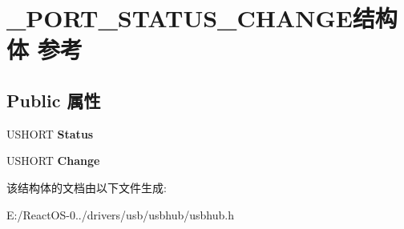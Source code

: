 \hypertarget{struct___p_o_r_t___s_t_a_t_u_s___c_h_a_n_g_e}{}\section{\+\_\+\+P\+O\+R\+T\+\_\+\+S\+T\+A\+T\+U\+S\+\_\+\+C\+H\+A\+N\+G\+E结构体 参考}
\label{struct___p_o_r_t___s_t_a_t_u_s___c_h_a_n_g_e}
\subsection*{Public 属性}
\begin{DoxyCompactItemize}
\item 
\mbox{\label{struct___p_o_r_t___s_t_a_t_u_s___c_h_a_n_g_e_ad899c0115605c2c062308daf5ec46718}} 
U\+S\+H\+O\+RT {\bfseries Status}
\item 
\mbox{\label{struct___p_o_r_t___s_t_a_t_u_s___c_h_a_n_g_e_a16a96d4ce956afe8686e3d887aecfd1c}} 
U\+S\+H\+O\+RT {\bfseries Change}
\end{DoxyCompactItemize}


该结构体的文档由以下文件生成\+:\begin{DoxyCompactItemize}
\item 
E\+:/\+React\+O\+S-\/0../drivers/usb/usbhub/usbhub.\+h\end{DoxyCompactItemize}
